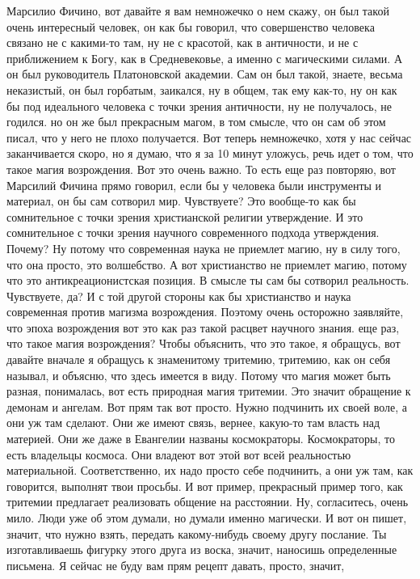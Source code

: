 Марсилио Фичино, вот давайте я вам немножечко
о нем скажу, он был такой очень интересный человек, он как бы говорил, что
совершенство человека связано не с какими-то там, ну не с красотой, как в
античности, и не с приближением к Богу, как в Средневековье, а именно с
магическими силами. А он был руководитель Платоновской академии. Сам он был
такой, знаете, весьма неказистый, он был горбатым, заикался, ну в общем, так ему
как-то, ну он как бы под идеального человека с точки зрения античности, ну не
получалось, не годился. но он же был прекрасным магом, в том смысле, что он сам
об этом писал, что у него не плохо получается. Вот теперь немножечко, хотя у нас
сейчас заканчивается скоро, но я думаю, что я за 10 минут уложусь, речь идет о
том, что такое магия возрождения. Вот это очень важно. То есть еще раз повторяю,
вот Марсилий Фичина прямо говорил, если бы у человека были инструменты и
материал, он бы сам сотворил мир. Чувствуете? Это вообще-то как бы сомнительное
с точки зрения христианской религии утверждение. И это сомнительное с точки
зрения научного современного подхода утверждения. Почему? Ну потому что
современная наука не приемлет магию, ну в силу того, что она просто, это
волшебство. А вот христианство не приемлет магию, потому что это
антикреационистская позиция. В смысле ты сам бы сотворил реальность. Чувствуете,
да? И с той другой стороны как бы христианство и наука современная против
магизма возрождения. Поэтому очень осторожно заявляйте, что эпоха возрождения
вот это как раз такой расцвет научного знания. еще раз, что такое магия
возрождения? Чтобы объяснить, что это такое, я обращусь, вот давайте вначале я
обращусь к знаменитому тритемию, тритемию, как он себя называл, и объясню, что
здесь имеется в виду. Потому что магия может быть разная, понималась, вот есть
природная магия тритемии. Это значит обращение к демонам и ангелам. Вот прям так
вот просто. Нужно подчинить их своей воле, а они уж там сделают. Они же имеют
связь, вернее, какую-то там власть над материей. Они же даже в Евангелии названы
космократоры. Космократоры, то есть владельцы космоса. Они владеют вот этой вот
всей реальностью материальной. Соответственно, их надо просто себе подчинить, а
они уж там, как говорится, выполнят твои просьбы. И вот пример, прекрасный
пример того, как тритемии предлагает реализовать общение на расстоянии. Ну,
согласитесь, очень мило. Люди уже об этом думали, но думали именно магически. И
вот он пишет, значит, что нужно взять, передать какому-нибудь своему другу
послание. Ты изготавливаешь фигурку этого друга из воска, значит, наносишь
определенные письмена. Я сейчас не буду вам прям рецепт давать, просто, значит,
